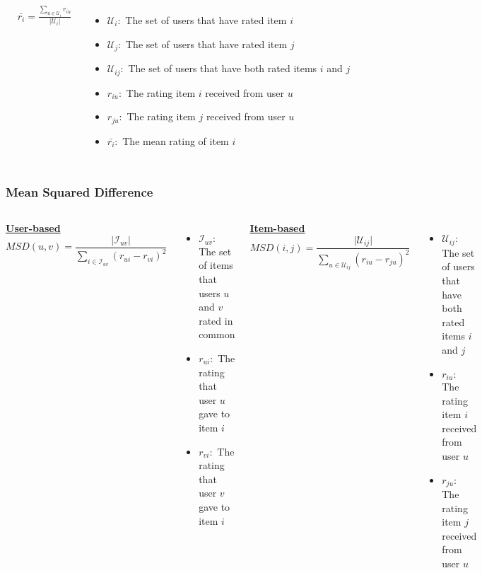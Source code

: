\begin{frame}
\begin{columns}
\begin{equation*}
\begin{split}
            &\bar{r_{i}} = \frac{\sum_{u \in \mathcal{U}_i}r_{iu}}
                                {\mathopen|\mathcal{U}_i\mathclose|}
        \end{split}
        \end{equation*}
        \tiny
        \begin{itemize}
            \item $\mathcal{U}_{i}:$ The set of users that have rated item $i$
            \item $\mathcal{U}_{j}:$ The set of users that have rated item $j$
            \item $\mathcal{U}_{ij}:$ The set of users that have both rated items $i$ and $j$
            \item $r_{iu}:$ The rating item $i$ received from user $u$
            \item $r_{ju}:$ The rating item $j$ received from user $u$
            \item $\bar{r_{i}}:$ The mean rating of item $i$
        \end{itemize}
    \end{columns}
\end{frame}
\begin{frame}
    \frametitle{Mean Squared Difference}
    \begin{columns}
        \centering
        \underline{\textbf{User-based}}
        \begin{equation*}
        MSD(u,v) = \frac{\mathopen|\mathcal{I}_{uv}\mathclose|}
                        {\sum_{i \in \mathcal{I}_{uv}}(r_{ui}-r_{vi})^2}
    \end{equation*}
        \tiny
        \begin{itemize}
            \item $\mathcal{I}_{uv}:$ The set of items that users $u$ and $v$ rated in common
            \item $r_{ui}:$ The rating that user $u$ gave to item $i$
            \item $r_{vi}:$ The rating that user $v$ gave to item $i$
        \end{itemize}
        \centering
        \underline{\textbf{Item-based}}
        \begin{equation*}
        MSD(i,j) = \frac{\mathopen|\mathcal{U}_{ij}\mathclose|}
                        {\sum_{u \in \mathcal{U}_{ij}}(r_{iu}-r_{ju})^2}
    \end{equation*}
        \tiny
        \begin{itemize}
            \item $\mathcal{U}_{ij}:$ The set of users that have both rated items $i$ and $j$
            \item $r_{iu}:$ The rating item $i$ received from user $u$
            \item $r_{ju}:$ The rating item $j$ received from user $u$
        \end{itemize}
    \end{columns}
\end{frame}
